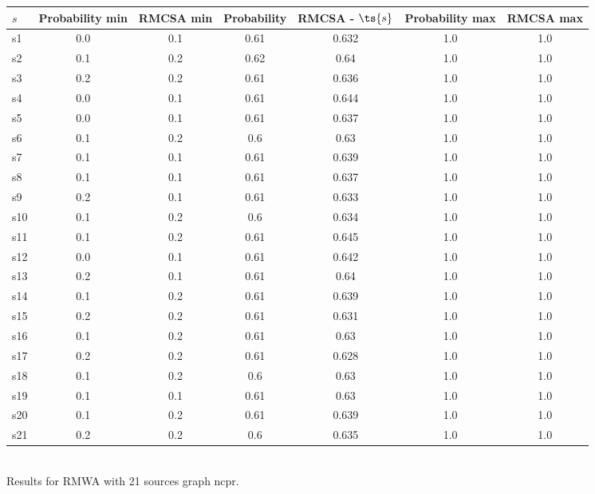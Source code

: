 \documentclass{article}
\begin{document}
\noindent\begin{tabular}{|l|c|c|c|c|c|c|}
\hline
$s$& Probability min & RMCSA min & Probability & RMCSA - $\ts{s}$ & Probability max & RMCSA max\\
\hline
s1 &0.0 & 0.1 & 0.61 & 0.632 & 1.0 & 1.0\\
\hline
s2 &0.1 & 0.2 & 0.62 & 0.64 & 1.0 & 1.0\\
\hline
s3 &0.2 & 0.2 & 0.61 & 0.636 & 1.0 & 1.0\\
\hline
s4 &0.0 & 0.1 & 0.61 & 0.644 & 1.0 & 1.0\\
\hline
s5 &0.0 & 0.1 & 0.61 & 0.637 & 1.0 & 1.0\\
\hline
s6 &0.1 & 0.2 & 0.6 & 0.63 & 1.0 & 1.0\\
\hline
s7 &0.1 & 0.1 & 0.61 & 0.639 & 1.0 & 1.0\\
\hline
s8 &0.1 & 0.1 & 0.61 & 0.637 & 1.0 & 1.0\\
\hline
s9 &0.2 & 0.1 & 0.61 & 0.633 & 1.0 & 1.0\\
\hline
s10 &0.1 & 0.2 & 0.6 & 0.634 & 1.0 & 1.0\\
\hline
s11 &0.1 & 0.2 & 0.61 & 0.645 & 1.0 & 1.0\\
\hline
s12 &0.0 & 0.1 & 0.61 & 0.642 & 1.0 & 1.0\\
\hline
s13 &0.2 & 0.1 & 0.61 & 0.64 & 1.0 & 1.0\\
\hline
s14 &0.1 & 0.2 & 0.61 & 0.639 & 1.0 & 1.0\\
\hline
s15 &0.2 & 0.2 & 0.61 & 0.631 & 1.0 & 1.0\\
\hline
s16 &0.1 & 0.2 & 0.61 & 0.63 & 1.0 & 1.0\\
\hline
s17 &0.2 & 0.2 & 0.61 & 0.628 & 1.0 & 1.0\\
\hline
s18 &0.1 & 0.2 & 0.6 & 0.63 & 1.0 & 1.0\\
\hline
s19 &0.1 & 0.1 & 0.61 & 0.63 & 1.0 & 1.0\\
\hline
s20 &0.1 & 0.2 & 0.61 & 0.639 & 1.0 & 1.0\\
\hline
s21 &0.2 & 0.2 & 0.6 & 0.635 & 1.0 & 1.0\\
\hline
\end{tabular}\\

\noindent Results for RMWA with 21 sources graph ncpr.
\end{document}
